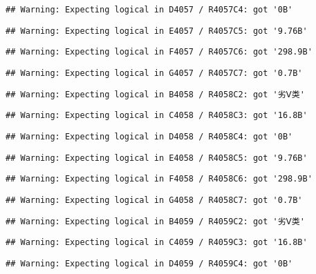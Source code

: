 \documentclass[
]{article}
\begin{document}
\begin{verbatim}
## Warning: Expecting logical in D4057 / R4057C4: got '0B'
\end{verbatim}

\begin{verbatim}
## Warning: Expecting logical in E4057 / R4057C5: got '9.76B'
\end{verbatim}

\begin{verbatim}
## Warning: Expecting logical in F4057 / R4057C6: got '298.9B'
\end{verbatim}

\begin{verbatim}
## Warning: Expecting logical in G4057 / R4057C7: got '0.7B'
\end{verbatim}

\begin{verbatim}
## Warning: Expecting logical in B4058 / R4058C2: got '劣Ⅴ类'
\end{verbatim}

\begin{verbatim}
## Warning: Expecting logical in C4058 / R4058C3: got '16.8B'
\end{verbatim}

\begin{verbatim}
## Warning: Expecting logical in D4058 / R4058C4: got '0B'
\end{verbatim}

\begin{verbatim}
## Warning: Expecting logical in E4058 / R4058C5: got '9.76B'
\end{verbatim}

\begin{verbatim}
## Warning: Expecting logical in F4058 / R4058C6: got '298.9B'
\end{verbatim}

\begin{verbatim}
## Warning: Expecting logical in G4058 / R4058C7: got '0.7B'
\end{verbatim}

\begin{verbatim}
## Warning: Expecting logical in B4059 / R4059C2: got '劣Ⅴ类'
\end{verbatim}

\begin{verbatim}
## Warning: Expecting logical in C4059 / R4059C3: got '16.8B'
\end{verbatim}

\begin{verbatim}
## Warning: Expecting logical in D4059 / R4059C4: got '0B'
\end{verbatim}
\end{document}
